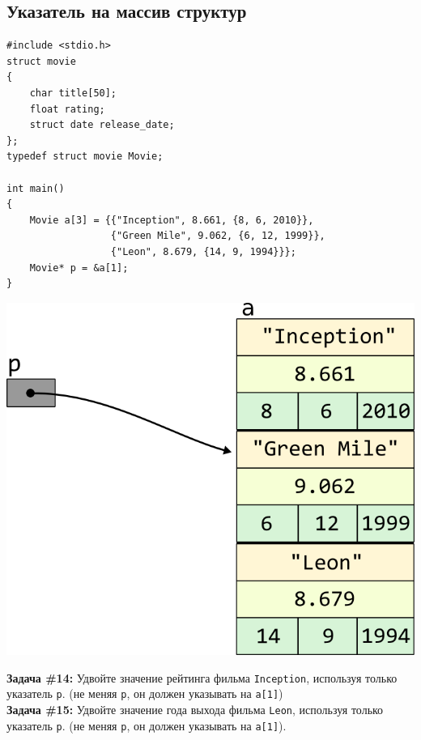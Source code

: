 \documentclass{article}
\begin{document}
\subsection*{Указатель на массив структур}
\begin{lstlisting}
#include <stdio.h>
struct movie
{
	char title[50];
	float rating;
	struct date release_date;
};
typedef struct movie Movie;

int main()
{
	Movie a[3] = {{"Inception", 8.661, {8, 6, 2010}}, 
	              {"Green Mile", 9.062, {6, 12, 1999}}, 
	              {"Leon", 8.679, {14, 9, 1994}}};
	Movie* p = &a[1];
}
\end{lstlisting}

\vspace{-59ex}
\begin{center}
\quad\quad\quad\quad\quad\quad\quad\quad\quad\quad\quad\quad\quad\quad\quad\quad\quad\quad\quad\quad\quad\quad\quad
\includegraphics[scale=1]{../../images/pointer_schemes/pointer_to_array_of_struct_movie.png}
\end{center}
\textbf{Задача \#14:} Удвойте значение рейтинга фильма \texttt{Inception}, используя только указатель \texttt{p}. (не меняя \texttt{p}, он должен указывать на \texttt{a[1]})\\
\textbf{Задача \#15:} Удвойте значение года выхода фильма \texttt{Leon}, используя только указатель \texttt{p}. (не меняя \texttt{p}, он должен указывать на \texttt{a[1]}).\\
\end{document}
